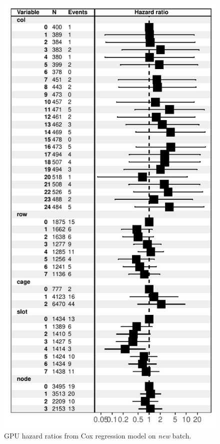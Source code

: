 \begin{figure}
  \centering
  \includegraphics[width=\columnwidth]{figs/cox_n001.pdf}
  \caption{GPU hazard ratios from Cox regression model on {\em new}
    batch.}
  \label{fig:cox-new}
\end{figure}


